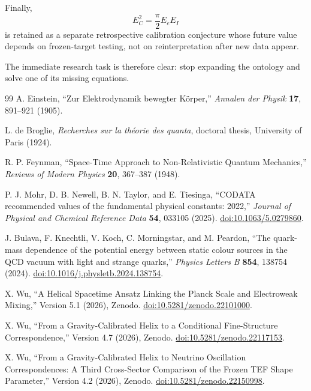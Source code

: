 \documentclass[10pt]{article}
\begin{document}
Finally, \[
E_C^2=\frac{\pi}{2}E_eE_I
\] is retained as a separate retrospective calibration conjecture whose future value depends on frozen-target testing, not on reinterpretation after new data appear.

The immediate research task is therefore clear: stop expanding the ontology and solve one of its missing equations.

\balance

\begin{thebibliography}{99}
\small
{}
A. Einstein, ``Zur Elektrodynamik bewegter K{\"o}rper,'' \emph{Annalen der Physik} \textbf{17}, 891--921 (1905).

L. de Broglie, \emph{Recherches sur la th{\'e}orie des quanta}, doctoral thesis, University of Paris (1924).

R. P. Feynman, ``Space-Time Approach to Non-Relativistic Quantum Mechanics,'' \emph{Reviews of Modern Physics} \textbf{20}, 367--387 (1948).

P. J. Mohr, D. B. Newell, B. N. Taylor, and E. Tiesinga, ``CODATA recommended values of the fundamental physical constants: 2022,'' \emph{Journal of Physical and Chemical Reference Data} \textbf{54}, 033105 (2025). \href{https://doi.org/10.1063/5.0279860}{doi:10.1063/5.0279860}.

J. Bulava, F. Knechtli, V. Koch, C. Morningstar, and M. Peardon, ``The quark-mass dependence of the potential energy between static colour sources in the QCD vacuum with light and strange quarks,'' \emph{Physics Letters B} \textbf{854}, 138754 (2024). \href{https://doi.org/10.1016/j.physletb.2024.138754}{doi:10.1016/j.physletb.2024.138754}.

X. Wu, ``A Helical Spacetime Ansatz Linking the Planck Scale and Electroweak Mixing,'' Version 5.1 (2026), Zenodo. \href{https://doi.org/10.5281/zenodo.22101000}{doi:10.5281/zenodo.22101000}.

X. Wu, ``From a Gravity-Calibrated Helix to a Conditional Fine-Structure Correspondence,'' Version 4.7 (2026), Zenodo. \href{https://doi.org/10.5281/zenodo.22117153}{doi:10.5281/zenodo.22117153}.

X. Wu, ``From a Gravity-Calibrated Helix to Neutrino Oscillation Correspondences: A Third Cross-Sector Comparison of the Frozen TEF Shape Parameter,'' Version 4.2 (2026), Zenodo. \href{https://doi.org/10.5281/zenodo.22150998}{doi:10.5281/zenodo.22150998}.


\end{thebibliography}
\end{document}
